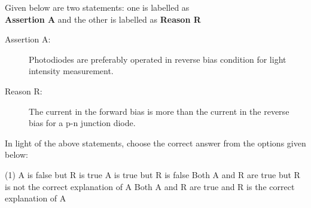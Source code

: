 \item Given below are two statements: one is labelled as \\
\textbf{Assertion A} and the other is labelled as \textbf{Reason R}
\begin{description}
    \item[Assertion A:] Photodiodes are preferably operated in reverse bias condition for light intensity measurement.
    \item[Reason R:] The current in the forward bias is more than the current in the reverse bias for a p-n junction diode.
\end{description}
In light of the above statements, choose the correct answer from the options given below:

\begin{tasks}(1)
    \task A is false but R is true
    \task A is true but R is false
    \task Both A and R are true but R is not the correct explanation of A
    \task Both A and R are true and R is the correct explanation of A
\end{tasks}